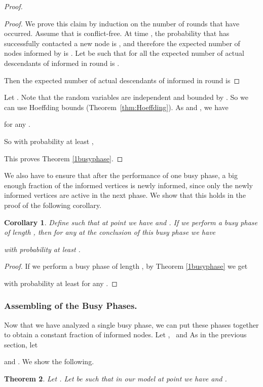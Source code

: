 \documentclass[12pt]{article}
\newtheorem{theorem}{Theorem}
\newtheorem{cor}[theorem]{Corollary}
\newcommand{\thmref}[1]{Theorem~\ref{thm:#1}}
\begin{document}
{\begin{proof}
\begin{proof}
We prove this claim by induction on the number of rounds that have occurred. Assume that  is conflict-free.
At time , the probability that  has successfully contacted a new node is , and therefore the expected number of nodes informed by  is .
Let  be such that for all  the expected number of actual descendants of  informed in round  is .

Then the expected number of actual descendants of  informed in round  is 
	
\end{proof}
Let . 
Note that the random variables  are independent and bounded by . So we can use Hoeffding bounds (\thmref{Hoeffding}). As  and , we have

for any .

So with probability at least ,

This proves Theorem \ref{1busyphase}.
\end{proof}


We also have to ensure that after the performance of one busy phase, a big enough fraction of the informed vertices is newly informed, since only the newly informed vertices are active in the next phase. We show that this holds in the proof of the following corollary.


\begin{cor}\label{OneBusyPhase2}
Define  such that at point  we have  and .
If we perform a busy phase of length , then for any  at the conclusion of this busy phase we have

with probability at least .
\end{cor}
\begin{proof}
If we perform a busy phase of length , by Theorem \ref{1busyphase} we get

with probability at least  for any .
\end{proof}



\subsubsection{Assembling of the Busy Phases.}

Now that we have analyzed a single busy phase, we can put these phases together to obtain a constant fraction of informed nodes.
Let ,~ and 
As in the previous section, let
 
and . 
We show the following.

\begin{theorem}\label{allbusyphases}
Let . Let  be such that in our model at point  we have  and . 


\end{theorem}}
\end{document}
